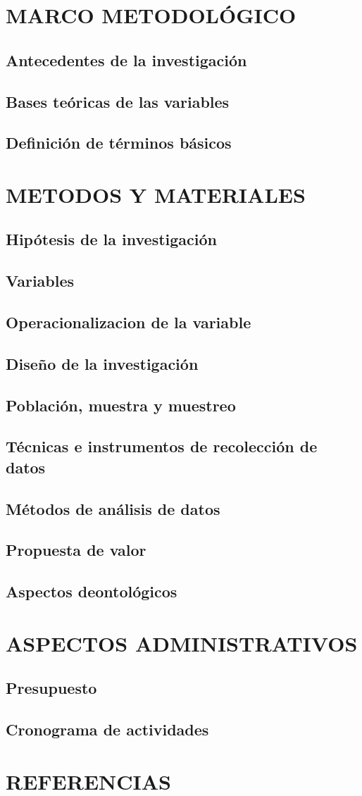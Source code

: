 \section{MARCO METODOLÓGICO}
\subsection{Antecedentes de la investigación}
\subsection{Bases teóricas de las variables}
\subsection{Definición de términos básicos}

\section{METODOS Y MATERIALES}
\subsection{Hipótesis de la investigación}
\subsection{Variables}
\subsection{Operacionalizacion de la variable}
\subsection{Diseño de la investigación}
\subsection{Población, muestra y muestreo}
\subsection{Técnicas e instrumentos de recolección de datos}
\subsection{Métodos de análisis de datos}
\subsection{Propuesta de valor}
\subsection{Aspectos deontológicos}

\section{ASPECTOS ADMINISTRATIVOS}
\subsection{Presupuesto}
\subsection{Cronograma de actividades}

\section{REFERENCIAS}
